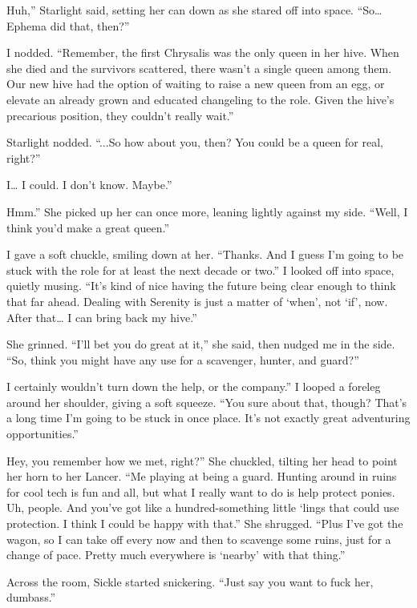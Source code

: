 \leavevmode{}Huh,” Starlight said, setting her can down as she stared off into space. “So… Ephema did that, then?”

I nodded. “Remember, the first Chrysalis was the only queen in her hive. When she died and the survivors scattered, there wasn’t a single queen among them. Our new hive had the option of waiting to raise a new queen from an egg, or elevate an already grown and educated changeling to the role. Given the hive’s precarious position, they couldn’t really wait.”

Starlight nodded. “...So how about you, then? You could be a queen for real, right?”

\leavevmode{}I… I could. I don’t know. Maybe.”

\leavevmode{}Hmm.” She picked up her can once more, leaning lightly against my side. “Well, I think you’d make a great queen.”

I gave a soft chuckle, smiling down at her. “Thanks. And I guess I’m going to be stuck with the role for at least the next decade or two.” I looked off into space, quietly musing. “It’s kind of nice having the future being clear enough to think that far ahead. Dealing with Serenity is just a matter of ‘when’, not ‘if’, now. After that… I can bring back my hive.”

She grinned. “I’ll bet you do great at it,” she said, then nudged me in the side. “So, think you might have any use for a scavenger, hunter, and guard?”

\leavevmode{}I certainly wouldn’t turn down the help, or the company.” I looped a foreleg around her shoulder, giving a soft squeeze. “You sure about that, though? That’s a long time I’m going to be stuck in once place. It’s not exactly great adventuring opportunities.”

\leavevmode{}Hey, you remember how we met, right?” She chuckled, tilting her head to point her horn to her Lancer. “Me playing at being a guard. Hunting around in ruins for cool tech is fun and all, but what I really want to do is help protect ponies. Uh, people. And you’ve got like a hundred-something little ‘lings that could use protection. I think I could be happy with that.” She shrugged. “Plus I’ve got the wagon, so I can take off every now and then to scavenge some ruins, just for a change of pace. Pretty much everywhere is ‘nearby’ with that thing.”

Across the room, Sickle started snickering. “Just say you want to fuck her, dumbass.”

